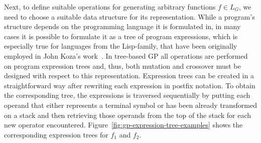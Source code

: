 Next, to define suitable operations for generating arbitrary functions $f \in L_G$, we need to choose a suitable data structure for its representation.
While a program's structure depends on the programming language it is formulated in, in many cases it is possible to formulate it as a tree of program expressions, which is especially true for languages from the Lisp-family, that have been originally employed in John Koza's work~\cite{koza1994genetic}.
In tree-based GP all operations are performed on program expression trees and, thus, both mutation and crossover must be designed with respect to this representation.
Expression trees can be created in a straightforward way after rewriting each expression in postfix notation. 
To obtain the corresponding tree, the expressions is traversed sequentially by putting each operand that either represents a terminal symbol or has been already transformed on a stack and then retrieving those operands from the top of the stack for each new operator encountered.
Figure~\ref{fig:gp-expression-tree-examples} shows the corresponding expression trees for $f_1$ and $f_2$.
